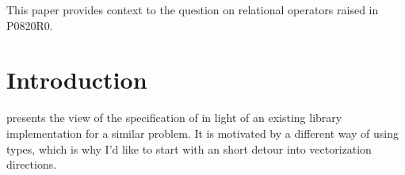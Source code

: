\newcommand\wgTitle{simd<T> is neither a product type nor a container type}
\newcommand\wgName{Matthias Kretz <m.kretz@gsi.de>}
\newcommand\wgDocumentNumber{P0851R0}
\newcommand\wgGroup{LEWG / SG1}

\usepackage{mymacros}
\usepackage{wg21}
\usepackage{underscore}



\newcommand\simd[1][]{\type{simd#1}\xspace}
\newcommand\simdT{\type{simd<T>}\xspace}
\newcommand\valuetype{\type{value\_type}\xspace}
\newcommand\referencetype{\type{reference}\xspace}
\newcommand\whereexpression{\type{where\_expression}\xspace}
\newcommand\simdcast{\code{simd\_cast}\xspace}
\newcommand\mask[1][]{\type{simd\_mask#1}\xspace}
\newcommand\maskT{\type{simd\_mask<T>}\xspace}
\newcommand\fixedsizeN{\type{simd\_abi::fixed\_size<N>}\xspace}
\newcommand\fixedsizescoped{\type{simd\_abi::fixed\_size}\xspace}
\newcommand\fixedsize{\type{fixed\_size}\xspace}
\newcommand\simdEP{\code{execution::}\type{simd}\xspace}
\newcommand\seqEP{\code{execution::}\type{seq}\xspace}

\newcommand\flagsRemarks[1]{
  \pnum\requires
  If the \type{Flags} template parameter is of type \type{flags::vector\_aligned\_tag}, the pointer value represents an address aligned to \code{memory\_alignment\_v<#1>}.
  If the \type{Flags} template parameter is of type \type{flags::overaligned\_tag<N>}, the pointer value represents an address aligned to \code N.
}

\newcommand\targetArch{target architecture\xspace}
\newcommand\targetArchs{target architectures\xspace}
\newcommand\currentTarget{currently targeted system\xspace}

\newcommand\realArithmeticType{arithmetic type except \type{bool}\xspace}

\usepackage{pifont}

\renewcommand\foralli[1][]{for all \code i $\in$ \code{[0, #1size())}\xspace}
\renewcommand\forallmaskedi[1]{%
  for all \code i
  $\in \{j \in \mathbb{N}_0 | j < \code{size()} ⋀ \code{#1[}j\code{]}\}$%
  \xspace%
}


\begin{wgTitlepage}
  This paper provides context to the question on relational operators raised in P0820R0.
\end{wgTitlepage}

\pagestyle{scrheadings}
\section{Introduction}
\textcite{P0820R0} presents the view of the  specification of \textcite{P0214R5} in light of an existing library implementation for a similar problem.
It is motivated by a different way of using \simd types, which is why I'd like to start with an short detour into vectorization directions.

